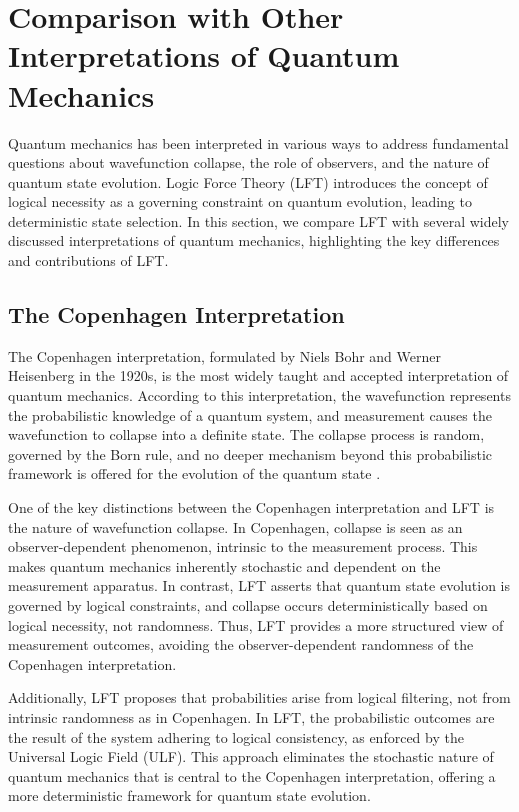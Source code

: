 \section{Comparison with Other Interpretations of Quantum Mechanics}

Quantum mechanics has been interpreted in various ways to address fundamental questions about wavefunction collapse, the role of observers, and the nature of quantum state evolution. Logic Force Theory (LFT) introduces the concept of logical necessity as a governing constraint on quantum evolution, leading to deterministic state selection. In this section, we compare LFT with several widely discussed interpretations of quantum mechanics, highlighting the key differences and contributions of LFT.

\subsection{The Copenhagen Interpretation}
The Copenhagen interpretation, formulated by Niels Bohr and Werner Heisenberg in the 1920s, is the most widely taught and accepted interpretation of quantum mechanics. According to this interpretation, the wavefunction represents the probabilistic knowledge of a quantum system, and measurement causes the wavefunction to collapse into a definite state. The collapse process is random, governed by the Born rule, and no deeper mechanism beyond this probabilistic framework is offered for the evolution of the quantum state \cite{bohr1928}.

One of the key distinctions between the Copenhagen interpretation and LFT is the nature of wavefunction collapse. In Copenhagen, collapse is seen as an observer-dependent phenomenon, intrinsic to the measurement process. This makes quantum mechanics inherently stochastic and dependent on the measurement apparatus. In contrast, LFT asserts that quantum state evolution is governed by logical constraints, and collapse occurs deterministically based on logical necessity, not randomness. Thus, LFT provides a more structured view of measurement outcomes, avoiding the observer-dependent randomness of the Copenhagen interpretation.

Additionally, LFT proposes that probabilities arise from logical filtering, not from intrinsic randomness as in Copenhagen. In LFT, the probabilistic outcomes are the result of the system adhering to logical consistency, as enforced by the Universal Logic Field (ULF). This approach eliminates the stochastic nature of quantum mechanics that is central to the Copenhagen interpretation, offering a more deterministic framework for quantum state evolution.

